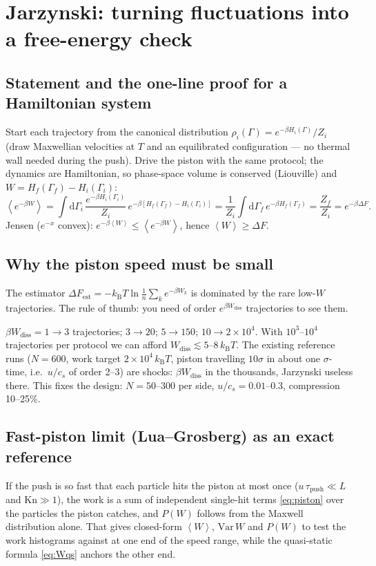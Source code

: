 \documentclass[11pt,a4paper]{article}
\newcommand{\kT}{k_{\mathrm B}T}
\newcommand{\ie}{i.e.\ }
\newcommand{\avg}[1]{\left\langle #1 \right\rangle}
\newcommand{\dd}{\mathrm{d}}
\begin{document}
\section{Jarzynski: turning fluctuations into a free-energy check}

\subsection{Statement and the one-line proof for a Hamiltonian system}
Start each trajectory from the canonical distribution $\rho_i(\Gamma) = e^{-\beta H_i(\Gamma)}/Z_i$ (draw Maxwellian velocities at $T$ and an equilibrated configuration --- no thermal wall needed during the push). Drive the piston with the same protocol; the dynamics are Hamiltonian, so phase-space volume is conserved (Liouville) and $W = H_f(\Gamma_f) - H_i(\Gamma_i)$:
\begin{equation}
\avg{e^{-\beta W}} = \int \dd\Gamma_i\,\frac{e^{-\beta H_i(\Gamma_i)}}{Z_i}\,e^{-\beta[H_f(\Gamma_f)-H_i(\Gamma_i)]}
= \frac{1}{Z_i}\int\dd\Gamma_f\,e^{-\beta H_f(\Gamma_f)} = \frac{Z_f}{Z_i} = e^{-\beta\Delta F}.
\label{eq:jarz}
\end{equation}
Jensen ($e^{-x}$ convex): $e^{-\beta\avg W}\le\avg{e^{-\beta W}}$, hence $\avg W \ge \Delta F$.

\subsection{Why the piston speed must be small}
The estimator $\Delta F_{\mathrm{est}} = -\kT\ln\frac1n\sum_k e^{-\beta W_k}$ is dominated by the rare low-$W$ trajectories. The rule of thumb: you need of order $e^{\beta W_{\mathrm{diss}}}$ trajectories to see them.
\begin{worked}
$\beta W_{\mathrm{diss}} = 1 \to 3$ trajectories; $3 \to 20$; $5 \to 150$; $10 \to 2\times10^4$. With $10^3$--$10^4$ trajectories per protocol we can afford $W_{\mathrm{diss}} \lesssim 5$--$8\,\kT$. The existing reference runs ($N = 600$, work target $2\times10^4\,\kT$, piston travelling $10\sigma$ in about one $\sigma$-time, \ie $u/c_s$ of order 2--3) are shocks: $\beta W_{\mathrm{diss}}$ in the thousands, Jarzynski useless there. This fixes the design: $N = 50$--$300$ per side, $u/c_s = 0.01$--$0.3$, compression 10--25\%.
\end{worked}

\subsection{Fast-piston limit (Lua--Grosberg) as an exact reference}
If the push is so fast that each particle hits the piston at most once ($u\,\tau_{\mathrm{push}} \ll L$ and $\mathrm{Kn}\gg1$), the work is a sum of independent single-hit terms \eqref{eq:piston} over the particles the piston catches, and $P(W)$ follows from the Maxwell distribution alone. That gives closed-form $\avg W$, $\mathrm{Var}\,W$ and $P(W)$ to test the work histograms against at one end of the speed range, while the quasi-static formula \eqref{eq:Wqs} anchors the other end.
\end{document}
